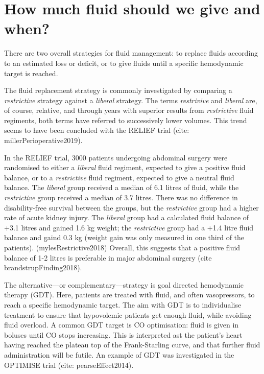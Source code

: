 \documentclass[a4paper, nobind]{templates/ociamthesis}
\begin{document}
\hypertarget{how-much-fluid-should-we-give-and-when}{%
\section{How much fluid should we give and when?}\label{how-much-fluid-should-we-give-and-when}}

There are two overall strategies for fluid management: to replace fluids according to an estimated loss or deficit, or to give fluids until a specific hemodynamic target is reached.

The fluid replacement strategy is commonly investigated by comparing a \emph{restrictive} strategy against a \emph{liberal} strategy. The terms \emph{restrivive} and \emph{liberal} are, of course, relative, and through years with superior results from \emph{restrictive} fluid regiments, both terms have referred to successively lower volumes. This trend seems to have been concluded with the RELIEF trial (cite: millerPerioperative2019).

In the RELIEF trial, 3000 patients undergoing abdominal surgery were randomised to either a \emph{liberal} fluid regiment, expected to give a positive fluid balance, or to a \emph{restrictive} fluid regiment, expected to give a neutral fluid balance. The \emph{liberal} group received a median of 6.1 litres of fluid, while the \emph{restrictive} group received a median of 3.7 litres. There was no difference in disability-free survival between the groups, but the \emph{restrictive} group had a higher rate of acute kidney injury. The \emph{liberal} group had a calculated fluid balance of +3.1 litres and gained 1.6 kg weight; the \emph{restrictive} group had a +1.4 litre fluid balance and gaind 0.3 kg (weight gain was only measured in one third of the patients). (mylesRestrictive2018) Overall, this suggests that a positive fluid balance of 1-2 litres is preferable in major abdominal surgery (cite brandstrupFinding2018).

The alternative---or complementary---strategy is goal directed hemodynamic therapy (GDT). Here, patients are treated with fluid, and often vasopressors, to reach a specific hemodynamic target. The aim with GDT is to individualise treatment to ensure that hypovolemic patients get enough fluid, while avoiding fluid overload. A common GDT target is CO optimisation: fluid is given in boluses until CO stops increasing. This is interpreted ast the patient's heart having reached the plateau top of the Frank-Starling curve, and that further fluid administration will be futile. An example of GDT was investigated in the OPTIMISE trial (cite: pearseEffect2014).
\end{document}
